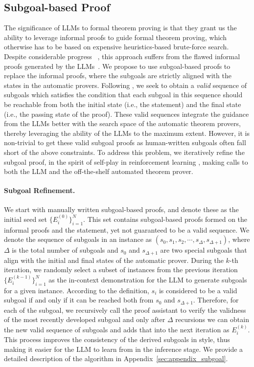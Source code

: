 \documentclass{article}
\begin{document}
\subsection{Subgoal-based Proof}
\label{sec:subgoal-based formatting}
The significance of LLMs to formal theorem proving is that they grant us the ability to leverage informal proofs to guide formal theorem proving, which otherwise has to be based on expensive heuristics-based brute-force search. Despite considerable progress ~\cite{lewkowycz2022solving,2023arXiv230308774O}, this approach suffers from the flawed informal proofs generated by the LLMs~\cite{jiang2022draft}. We propose to use subgoal-based proofs to replace the informal proofs, where the subgoals are strictly aligned with the states in the automatic provers.  Following \citet{zhang2021c}, we seek to obtain a \emph{valid} sequence of subgoals which satisfies the condition that each subgoal in this sequence should be reachable from both the initial state (i.e., the statement) and the final state (i.e., the passing state of the proof). These valid sequences integrate the guidance from the LLMs better with the search space of the automatic theorem provers, thereby leveraging the ability of the LLMs to the maximum extent. However, it is non-trivial to get these valid subgoal proofs as human-written subgoals often fall short of the above constraints. To address this problem, we iteratively refine the subgoal proof, in the spirit of self-play in reinforcement learning \cite{silver2016mastering}, making calls to both the LLM and the off-the-shelf automated theorem prover.

\paragraph{Subgoal Refinement.}
We start with manually written subgoal-based proofs, and denote these as the initial seed set $\{E^{(0)}_i\}_{i=1}^{N}$. This set contains subgoal-based proofs formed on the informal proofs and the statement, yet not guaranteed to be a valid sequence. We denote the sequence of subgoals in an instance as $(s_0, s_{1}, s_{2}, \cdots, s_{\Delta}, s_{\Delta+1})$, where $\Delta$ is the total number of subgoals and $s_0$ and $s_{\Delta+1}$ are two special subgoals that align with the initial and final states of the automatic prover. During the $k$-th iteration, we randomly select a subset of instances from the previous iteration $\{E^{(k-1)}_i\}_{i=1}^{N}$ as the in-context demonstration for the LLM to generate subgoals for a given instance. According to the definition, $s_{i}$ is considered to be a valid subgoal if and only if it can be reached both from $s_0$ and $s_{\Delta+1}$. Therefore, for each of the subgoal, we recursively call the proof assistant to verify the validness of the most recently developed subgoal and only after $\Delta$ recursions we can obtain the new valid sequence of subgoals and adds that into the next iteration as $E^{(k)}_i$. This process improves the consistency of the derived subgoals in style, thus making it easier for the LLM to learn from in the inference stage. We provide a detailed description of the algorithm in Appendix~\ref{sec:appendix_subgoal}. 
\end{document}
